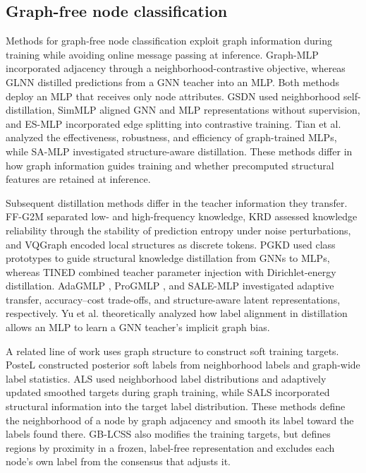 \documentclass[10pt,letterpaper,nopreprintline]{elsarticle}
\theoremstyle{plain}
\begin{document}
\subsection{Graph-free node classification}\label{sec:2.3}

Methods for graph-free node classification exploit graph information during training while avoiding online message passing at inference. Graph-MLP \cite{ref3} incorporated adjacency through a neighborhood-contrastive objective, whereas GLNN \cite{ref4} distilled predictions from a GNN teacher into an MLP. Both methods deploy an MLP that receives only node attributes. GSDN \cite{ref40} used neighborhood self-distillation, SimMLP \cite{ref41} aligned GNN and MLP representations without supervision, and ES-MLP \cite{ref42} incorporated edge splitting into contrastive training. Tian et al. \cite{ref43} analyzed the effectiveness, robustness, and efficiency of graph-trained MLPs, while SA-MLP \cite{ref44} investigated structure-aware distillation. These methods differ in how graph information guides training and whether precomputed structural features are retained at inference.

Subsequent distillation methods differ in the teacher information they transfer. FF-G2M \cite{ref45} separated low- and high-frequency knowledge, KRD \cite{ref46} assessed knowledge reliability through the stability of prediction entropy under noise perturbations, and VQGraph \cite{ref47} encoded local structures as discrete tokens. PGKD \cite{ref48} used class prototypes to guide structural knowledge distillation from GNNs to MLPs, whereas TINED \cite{ref49} combined teacher parameter injection with Dirichlet-energy distillation. AdaGMLP \cite{ref50}, ProGMLP \cite{ref51}, and SALE-MLP \cite{ref52} investigated adaptive transfer, accuracy--cost trade-offs, and structure-aware latent representations, respectively. Yu et al. \cite{ref53} theoretically analyzed how label alignment in distillation allows an MLP to learn a GNN teacher's implicit graph bias.

A related line of work uses graph structure to construct soft training targets. PosteL \cite{ref54} constructed posterior soft labels from neighborhood labels and graph-wide label statistics. ALS \cite{ref55} used neighborhood label distributions and adaptively updated smoothed targets during graph training, while SALS \cite{ref56} incorporated structural information into the target label distribution. These methods define the neighborhood of a node by graph adjacency and smooth its label toward the labels found there. GB-LCSS also modifies the training targets, but defines regions by proximity in a frozen, label-free representation and excludes each node's own label from the consensus that adjusts it.
\end{document}
